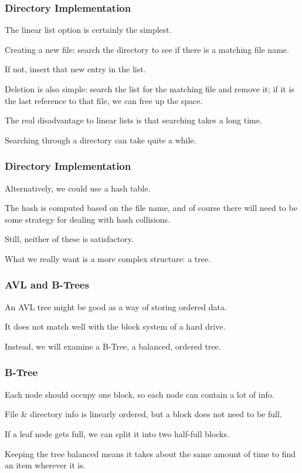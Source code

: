 \begin{frame}
\frametitle{Directory Implementation}

The linear list option is certainly the simplest. 

Creating a new file: search the directory to see if there is a matching file name. 

If not, insert that new entry in the list. 

Deletion is also simple: search the list for the matching file and remove it; if it is the last reference to that file, we can free up the space. 

The real disadvantage to linear lists is that searching takes a long time. 

Searching through a directory can take quite a while.

\end{frame}

\begin{frame}
\frametitle{Directory Implementation}

Alternatively, we could use a hash table. 

The hash is computed based on the file name, and of course there will need to be some strategy for dealing with hash collisions. 

Still, neither of these is satisfactory. 

What we really want is a more complex structure: a tree.


\end{frame}

\begin{frame}
\frametitle{AVL and B-Trees}


An AVL tree might be good as a way of storing ordered data. 

It does not match well with the block system of a hard drive. 

Instead, we will examine a B-Tree, a balanced, ordered tree.


\end{frame}

\begin{frame}
\frametitle{B-Tree}

Each node should occupy one block, so each node can contain a lot of info. 

File \& directory info is linearly ordered, but a block does not need to be full. 

If a leaf node gets full, we can split it into two half-full blocks. 

Keeping the tree balanced means it takes about the same amount of time to find an item wherever it is.


\end{frame}

